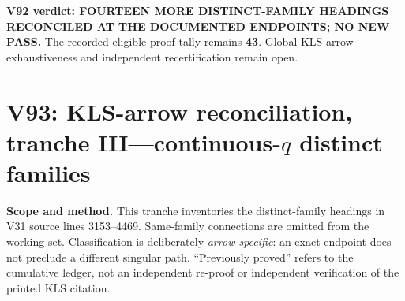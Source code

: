 \documentclass[11pt]{article}
\begin{document}
\noindent\textbf{V92 verdict: FOURTEEN MORE DISTINCT-FAMILY HEADINGS RECONCILED AT THE DOCUMENTED ENDPOINTS; NO NEW PASS.} The recorded eligible-proof tally remains \textbf{43}. Global KLS-arrow exhaustiveness and independent recertification remain open.


\section{V93: KLS-arrow reconciliation, tranche III---continuous-$q$ distinct families}
\noindent\textbf{Scope and method.} This tranche inventories the distinct-family headings in V31 source lines 3153--4469. Same-family connections are omitted from the working set. Classification is deliberately \emph{arrow-specific}: an exact endpoint does not preclude a different singular path. ``Previously proved'' refers to the cumulative ledger, not an independent re-proof or independent verification of the printed KLS citation.
\end{document}
